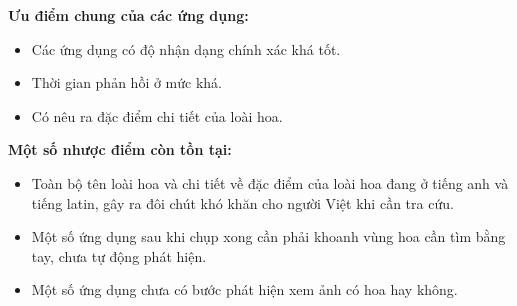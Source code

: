 \documentclass[12pt]{report}
\begin{document}
		\textbf{Ưu điểm chung của các ứng dụng:}
		\begin{itemize}
			\item Các ứng dụng có độ nhận dạng chính xác khá tốt.
			\item Thời gian phản hồi ở mức khá.
			\item Có nêu ra đặc điểm chi tiết của loài hoa.
		\end{itemize}

		\textbf{Một số nhược điểm còn tồn tại:}
		\begin{itemize}
			\item Toàn bộ tên loài hoa và chi tiết về đặc điểm của loài hoa đang ở tiếng anh và tiếng latin, gây ra đôi chút khó khăn cho người Việt khi cần tra cứu.
			\item Một số ứng dụng sau khi chụp xong cần phải khoanh vùng hoa cần tìm bằng tay, chưa tự động phát hiện.
			\item Một số ứng dụng chưa có bước phát hiện xem ảnh có hoa hay không.
		\end{itemize}
																		
\end{document}
